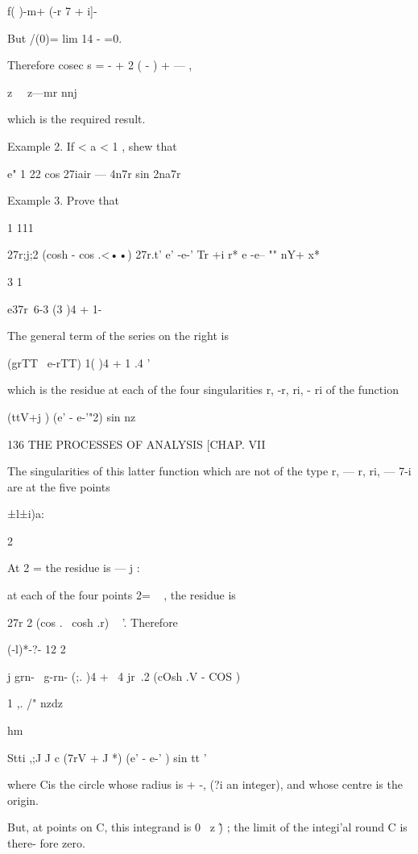 f( )-m+ (-r 7 + i]-



But /(0)= lim 14 - =0.

Therefore cosec s = - + 2 ( - ) + — ,

z \ \ z—mr nnj

which is the required result.

Example 2. If < a < 1 , shew that

e" 1 22 cos 27iair — 4n7r sin 2na7r



Example 3. Prove that

1 111



27r;j;2 (cosh - cos .<••) 27r.t' e' -e-' Tr +i r* e -e-- "" nY+ x*

3 1



e37r\ 6-3 (3 )4 + 1-

The general term of the series on the right is

(grTT \ e-rTT) 1( )4 + 1 .4 '

which is the residue at each of the four singularities r, -r, ri, - ri
of the function



(ttV+j ) (e' - e-'"2) sin nz



136 THE PROCESSES OF ANALYSIS [CHAP. VII

The singularities of this latter function which are not of the type r,
— r, ri, — 7-i are at the five points

 ±l±i)a:

2

At 2 = the residue is — j :

at each of the four points 2= ~ , the residue is

 27r 2 (cos . \ cosh .r) ~ '. Therefore

  (-l)*-?- 12 2



 j grn- \ g-rn- (;. )4 + \ 4 jr\ .2 (cOsh .V - COS )



1 ,. /" nzdz

hm



Stti ,;J J c (7rV + J *) (e' - e-' ) sin tt '

where Cis the circle whose radius is + -, (?i an integer), and whose
centre is the origin.

But, at points on C, this integrand is 0 \ z \~ ) ; the limit of the
integi'al round C is there- fore zero.

